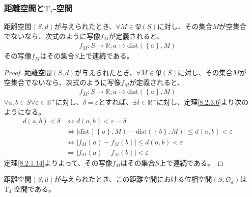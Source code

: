 \documentclass[dvipdfmx]{jsarticle}
\begin{document}
\subsubsection{距離空間と$\mathrm{T}_{4}$-空間}%
\begin{thm}\label{8.2.3.11}
距離空間$(S,d)$が与えられたとき、$\forall M \in \mathfrak{P}(S)$に対し、その集合$M$が空集合でないなら、次式のように写像$f_{M}$が定義されると、
\begin{align*}
f_{M}:S \rightarrow \mathbb{R};a \mapsto \mathrm{dist}\left( \left\{ a \right\},M \right)
\end{align*}
その写像$f_{M}$はその集合$S$上で連続である。
\end{thm}
\begin{proof}
距離空間$(S,d)$が与えられたとき、$\forall M \in \mathfrak{P}(S)$に対し、その集合$M$が空集合でないなら、次式のように写像$f_{M}$が定義されると、
\begin{align*}
f_{M}:S \rightarrow \mathbb{R};a \mapsto \mathrm{dist}\left( \left\{ a \right\},M \right)
\end{align*}
$\forall a,b \in S\forall\varepsilon \in \mathbb{R}^{+}$に対し、$\delta = \varepsilon$とすれば、$\exists\delta \in \mathbb{R}^{+}$に対し、定理\ref{8.2.3.6}より次のようになる。
\begin{align*}
d(a,b) < \delta &\Leftrightarrow d(a,b) < \varepsilon = \delta\\
&\Leftrightarrow \left| \mathrm{dist}\left( \left\{ a \right\},M \right) - \mathrm{dist}\left( \left\{ b \right\},M \right) \right| \leq d(a,b) < \varepsilon\\
&\Leftrightarrow \left| f_{M}(a) - f_{M}(b) \right| \leq d(a,b) < \varepsilon\\
&\Rightarrow \left| f_{M}(a) - f_{M}(b) \right| < \varepsilon
\end{align*}
定理\ref{8.2.1.14}よりよって、その写像$f_{M}$はその集合$S$上で連続である。
\end{proof}
\begin{thm}\label{8.2.3.12}
距離空間$(S,d)$が与えられたとき、この距離空間における位相空間$\left( S,\mathfrak{O}_{d} \right)$は$\mathrm{T}_{4}$-空間である。
\end{thm}
\end{document}
